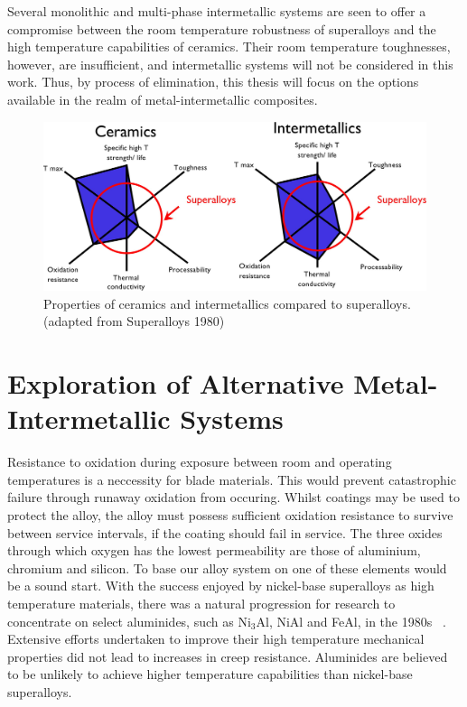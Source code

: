 Several monolithic and multi-phase intermetallic systems are seen to offer a compromise between the room temperature robustness of superalloys and the high temperature capabilities of ceramics. Their room temperature toughnesses, however, are insufficient, and intermetallic systems will not be considered in this work. Thus, by process of elimination, this thesis will focus on the options available in the realm of metal-intermetallic composites.
%
\begin{figure}[H]
\begin{center}
\includegraphics[width=\textwidth]{CeramicsIntermetallics}
\caption{Properties of ceramics and intermetallics compared to superalloys. (adapted from Superalloys 1980) }\label{fig:CeramicsIntermetallics}
\end{center}
\end{figure}
%
\section{Exploration of Alternative Metal-Intermetallic Systems}

Resistance to oxidation during exposure between room and operating temperatures is a neccessity for blade materials.  This would prevent catastrophic failure through runaway oxidation from occuring.  Whilst coatings may be used to protect the alloy, the alloy must possess sufficient oxidation resistance to survive between service intervals, if the coating should fail in service. The three oxides through which oxygen has the lowest permeability are those of aluminium, chromium and silicon.  To base our alloy system on one of these elements would be a sound start. With the success enjoyed by nickel-base superalloys as high temperature materials, there was a natural progression for research to concentrate on select aluminides, such as Ni$_3$Al, NiAl and FeAl, in the 1980s ~\cite{cotton93, miracle94a, walston93, white89}.  Extensive efforts undertaken to improve their high temperature mechanical properties did not lead to increases in creep resistance.  Aluminides are believed to be unlikely to achieve higher temperature capabilities than nickel-base superalloys.

